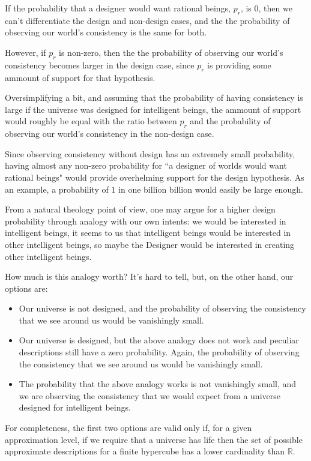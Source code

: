\documentclass[a4paper
,draft
]{article}
\def\reale{\mathbb{R}}
\newcommand{\ghilimele}[1]{``#1"}
\begin{document}
If the probability that a
designer would want rational beings, $p_r$, is $0$, then we can't
differentiate the design and non-design cases, and the
the probability of observing our world's consistency is the same
for both.

However, if $p_r$ is non-zero, then the
the probability of observing our world's consistency becomes larger in the
design case, since $p_r$ is providing some ammount of support for that
hypothesis.

Oversimplifying a bit, and assuming that the probability of having consistency
is large if the universe was designed for intelligent beings,
the ammount of support would
roughly be equal with the ratio between $p_r$ and the probability of observing
our world's consistency in the non-design case.

Since observing consistency without design has an extremely
small probability,
having almost any non-zero probability for
\ghilimele{a designer of worlds would want rational beings} would provide
overhelming support for the design hypothesis.
As an example, a probability
of $1$ in one billion billion would easily be large enough.

From a natural theology point of view, one may argue for a higher design
probability through analogy with our own intents: we would be interested
in intelligent beings, it seems to us that intelligent beings would be
interested in other intelligent beings, so maybe the Designer would be
interested in creating other intelligent beings.

How much is this analogy worth?
It's hard to tell, but, on the other hand, our options are:

\begin{itemize}
  \item Our universe is not designed,
        and the probability of observing the
        consistency that we see around us would be vanishingly small.
  \item Our universe is designed, but the above analogy does not work and
        peculiar descriptions still have a zero probability.
        Again, the probability of observing the
        consistency that we see around us would be vanishingly small.
  \item The probability that the above analogy works is not vanishingly small,
        and we are observing the consistency that we would expect from a
        universe designed for intelligent beings.
\end{itemize}
For completeness, the first two options are valid only if,
for a given approximation level, if we require that a universe has life then
the set of possible approximate descriptions for a finite hypercube
has a lower cardinality than $\reale$.
\end{document}
